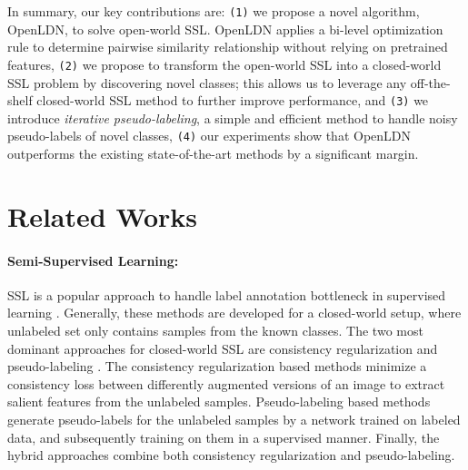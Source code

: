 \documentclass[runningheads]{eccv2022submission}
\newcommand{\txt}[1]{{\texttt{#1}}}
\begin{document}
\sloppy
In summary, our key contributions are: \txt{(1)} we propose a novel algorithm, OpenLDN, to solve open-world SSL. OpenLDN applies a bi-level optimization rule to determine pairwise similarity relationship without relying on pretrained features, \txt{(2)} we propose to transform the open-world SSL into a closed-world SSL problem by discovering novel classes; this allows us to leverage any off-the-shelf closed-world SSL method to further improve performance, and \txt{(3)} we introduce \emph{iterative pseudo-labeling}, a simple and efficient method to handle noisy pseudo-labels of novel classes, \txt{(4)} our experiments show that OpenLDN outperforms the existing state-of-the-art methods by a significant margin.

\vspace{-2mm}
\section{Related Works}
\vspace{-2mm}
\paragraph{\textbf{Semi-Supervised Learning:}}
SSL is a popular approach to handle label annotation bottleneck in supervised learning \cite{Gammerman1998Learning,joachims1999transductive,liu2019deep,kingma2014semi,pu2016variational,chen2020big,caron2020unsupervised}. Generally, these methods are developed for a closed-world setup, where unlabeled set only contains samples from the known classes. The two most dominant approaches for closed-world SSL are consistency regularization \cite{NIPS2016_6333,LaineA17,Miyato2018VirtualAT,NIPS2017_6719_meanT} and pseudo-labeling \cite{Lee2013PseudoLabelT,Shi_2018_ECCV,arazo2020pseudo,rizve2021in}. The consistency regularization based methods minimize a consistency loss between differently augmented versions of an image to extract salient features from the unlabeled samples. Pseudo-labeling based methods generate pseudo-labels for the unlabeled samples by a network trained on labeled data, and subsequently training on them in a supervised manner. Finally, the hybrid approaches \cite{NIPS2019_8749_MixMatch,Berthelot2020ReMixMatch:,FixMatch} combine both consistency regularization and pseudo-labeling.
\end{document}
